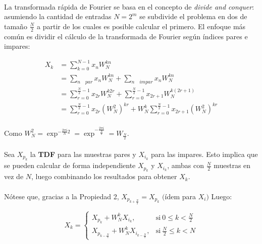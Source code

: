 \documentclass[12pt, twocolumn]{article}
\begin{document}
	\paragraph{} La transformada rápida de Fourier se basa en el concepto de \textit{divide and conquer}: asumiendo la cantidad de entradas $N = 2^{m}$ se subdivide el problema en dos de tamaño $\frac{N}{2}$ a partir de los cuales es posible calcular el primero. El enfoque más común es dividir el cálculo de la transformada de Fourier según índices pares e impares:
	
	\begin{align}
		X_{k} &= \sum_{k=0}^{N-1} x_{n}W_{N}^{kn} \\
		&= \sum_{n\quad par}x_{n}W_{N}^{kn} + \sum_{n\quad impar}x_{n}W_{N}^{kn} \\
		&= \sum_{r=0}^{\frac{N}{2}-1} x_{2r}W_{N}^{k2r} + \sum_{r=0}^{\frac{N}{2}-1}x_{2r+1}W_{N}^{k(2r+1)} \\
		&= \sum_{r=0}^{\frac{N}{2}-1}x_{2r}(W_{N}^{2})^{kr} + W_{N}^{k}\sum_{r=0}^{\frac{N}{2}-1}x_{2r+1}(W_{N}^{2})^{kr}
	\end{align}
	
	\paragraph{} Como $W_{N}^{2} = \exp^{-\frac{2\pi i}{N}2} = \exp^{-\frac{2\pi i}{\frac{N}{2}}} = W_{\frac{N}{2}}$.
	
	\paragraph{} Sea $X_{p_{k}}$ la \textbf{TDF} para las muestras pares y $X_{i_{k}}$ para las impares. Esto implica que se pueden calcular de forma independiente $X_{p_{k}}$ y $X_{i_{k}}$, ambas con $\frac{N}{2}$ muestras en vez de $N$, luego combinando los resultados para obtener $X_{k}$.
	
	\paragraph{} Nótese que, gracias a la Propiedad 2, $X_{p_{k+\frac{N}{2}}} = X_{p_{k}}$ $($ídem para $X_{i})$ Luego:
	
	\begin{equation}
	X_{k}=
	\begin{cases}
	X_{p_{k}}+W_{N}^{k}X_{i_{k}}, & \text{si}\ 0\le k< \frac{N}{2} \\
	X_{p_{k-\frac{N}{2}}}+W_{N}^{k}X_{i_{k-\frac{N}{2}}}, & \text{si}\ \frac{N}{2}\le k < N
	\end{cases}
	\end{equation}
	
\end{document}
